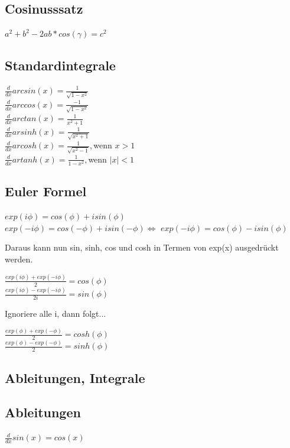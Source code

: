 \subsection{Cosinusssatz}
$a^2 + b^2 -2ab*cos(\gamma)= c^2$


\subsection{Standardintegrale}
$\frac{d}{dx} arcsin(x) = \frac{1}{\sqrt{1-x^2}}$ \\

$\frac{d}{dx} arccos(x) = \frac{-1}{\sqrt{1-x^2}}$ \\

$\frac{d}{dx} arctan(x) =\frac {1}{x^2+1}$\\

$\frac{d}{dx} arsinh(x) =\frac{1}{\sqrt{x^2+1}}$\\

$\frac{d}{dx} arcosh(x) =\frac{1}{\sqrt{x^2-1}}, $wenn $ x>1$\\

$\frac{d}{dx} artanh(x) =\frac{1}{1-x^2}, $wenn $ |x|<1$\\


\subsection{Euler Formel}
$exp(i \phi) = cos(\phi) + isin(\phi)$
\\
$exp(-i \phi) = cos(-\phi) + isin(-\phi) \Longleftrightarrow $ 
$exp(-i \phi) = cos(\phi) - isin(\phi)$ 

Daraus kann nun sin, sinh, cos und cosh in Termen von exp(x) ausgedrückt werden.

$\frac{exp(i \phi) + exp(-i \phi)}{2}  = cos(\phi)$\\
$\frac{exp(i \phi) - exp(-i \phi)}{2i}  = sin(\phi)$

Ignoriere alle i, dann folgt...

$\frac{exp(\phi) + exp(-\phi)}{2}  = cosh(\phi)$\\
$\frac{exp(\phi) - exp(-\phi)}{2}  = sinh(\phi)$




\subsection{Ableitungen, Integrale}
\subsection{Ableitungen}
$\frac{d}{dx}sin(x) = cos(x)$

